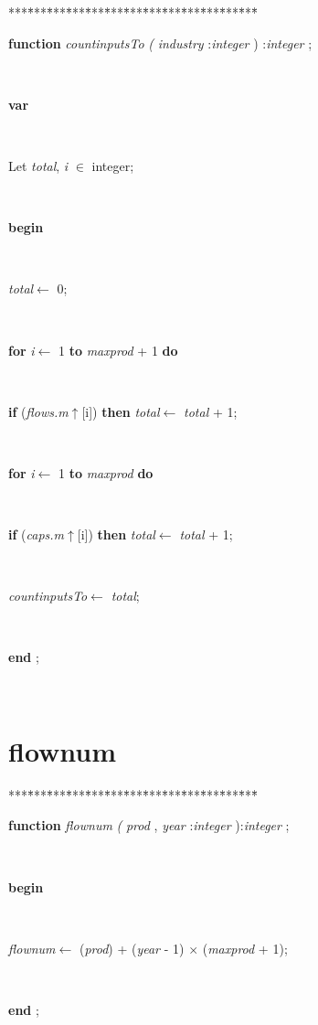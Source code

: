 \documentclass[10pt, a4paper]{article}
\begin{document}
\begin{tabbing}
***\=***\=***\=***\=***\=***\=***\=***\=***\=***\=***\=***\=***\=\kill
\parbox{14cm}{\textsf{\textbf{function}  \textit{countinputsTo} \textit{(}  \textit{industry} :\textit{integer} ) :\textit{integer} ;}}\\
\+\parbox{14cm}{\textsf{\textbf{var} }}\\
\parbox{14cm}{\textsf{Let \textit{total}, \textit{i} $\in$ integer;}}\\
\-\<\+\parbox{14cm}{\textsf{\textbf{begin} }}\\
\parbox{14cm}{\textsf{\textit{total}$\leftarrow$ 0}; }\\
\+\parbox{14cm}{\textsf {\textbf {for } \textsf{\textit{i}$\leftarrow$ 1} \textbf{ to } \textsf{\textit{maxprod} + 1} \textbf{ do } }}\\
\-\parbox{14cm}{\textsf {\textbf {if } \textsf{(\textit{flows.m}$\uparrow$\textit{}[i])} \textbf{ then } \textsf{\textit{total}$\leftarrow$ \textit{total} + 1}; }}\\
\+\parbox{14cm}{\textsf {\textbf {for } \textsf{\textit{i}$\leftarrow$ 1} \textbf{ to } \textsf{\textit{maxprod}} \textbf{ do } }}\\
\-\parbox{14cm}{\textsf {\textbf {if } \textsf{(\textit{caps.m}$\uparrow$\textit{}[i])} \textbf{ then } \textsf{\textit{total}$\leftarrow$ \textit{total} + 1}; }}\\
\parbox{14cm}{\textsf{\textit{countinputsTo}$\leftarrow$ \textit{total}}; }\\
\<\-\parbox{14cm}{\textsf{\textbf{end} ;}}\\
\end{tabbing}
\section{flownum}\label{sec:harmonyplanflownum}

\begin{tabbing}
***\=***\=***\=***\=***\=***\=***\=***\=***\=***\=***\=***\=***\=\kill
\parbox{14cm}{\textsf{\textbf{function}  \textit{flownum} \textit{(}  \textit{prod} ,  \textit{year} :\textit{integer} ):\textit{integer} ;}}\\
\+\parbox{14cm}{\textsf{\textbf{begin} }}\\
\parbox{14cm}{\textsf{\textit{flownum}$\leftarrow$ (\textit{prod}) + (\textit{year} - 1) $\times$ (\textit{maxprod} + 1)}; }\\
\<\-\parbox{14cm}{\textsf{\textbf{end} ;}}\\
\end{tabbing}
\end{document}
